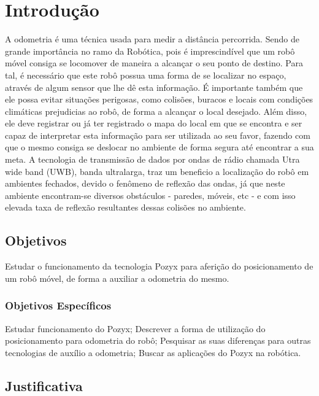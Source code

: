 \chapter{Introdução}
\label{chap:intro}

A odometria \'e uma t\'ecnica usada para medir a dist\^ancia percorrida. Sendo de grande import\^ancia no ramo da Rob\'otica, pois \'e imprescind\'ivel que um rob\^o m\'ovel consiga se locomover de maneira a alcan\c{c}ar o seu ponto de destino.
Para tal, \'e necess\'ario que este rob\^o possua uma forma de se localizar no espa\c{c}o, atrav\'es de algum sensor que lhe d\^e esta informa\c{c}\~ao.
\'E importante tamb\'em que ele possa evitar situa\c{c}\~oes perigosas, como colis\~oes, buracos e locais com condi\c{c}\~oes clim\'aticas prejudicias ao rob\^o, de forma a alcan\c{c}ar o local desejado.
Al\'em disso, ele deve registrar ou j\'a ter registrado o mapa do local em que se encontra e ser capaz de interpretar esta informa\c{c}\~ao para ser utilizada ao seu favor, fazendo com que o mesmo consiga se deslocar no ambiente de forma segura at\'e encontrar a sua meta.
A tecnologia de transmissão de dados por ondas de rádio chamada Utra wide band (UWB), banda ultralarga, traz um beneficio a localização do robô em ambientes fechados, devido o fenômeno de reflexão das ondas, já que neste ambiente encontram-se diversos obstáculos - paredes, móveis, etc - e com isso elevada taxa de reflexão resultantes dessas colisões no ambiente. 


\section{Objetivos}
\label{sec:obj}

Estudar o funcionamento da tecnologia Pozyx para aferi\c{c}\~ao do posicionamento de um rob\^o m\'ovel, de forma a auxiliar a odometria do mesmo.


\subsection{Objetivos Específicos}
\label{ssec:objesp}

Estudar funcionamento do Pozyx;
Descrever a forma de utiliza\c{c}\~ao do posicionamento para odometria do rob\^o;
Pesquisar as suas diferen\c{c}as para outras tecnologias de aux\'ilio a odometria;
Buscar as aplica\c{c}\~oes do Pozyx na rob\'otica.


\section{Justificativa}
\label{sec:justi}

